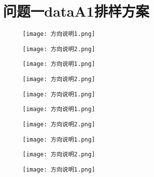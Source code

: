 \documentclass[bwprint]{gmcmthesis}
\begin{document}
\section{问题一dataA1排样方案}
\begin{figure}[!htbp]
    \centering
    \begin{minipage}{0.1\linewidth}
        \centering
        \texttt{[image: 方向说明1.png]}
    \end{minipage}
    \begin{minipage}{0.1\linewidth}
        \centering
        \texttt{[image: 方向说明2.png]}
    \end{minipage}
    \begin{minipage}{0.1\linewidth}
        \centering
        \texttt{[image: 方向说明1.png]}
    \end{minipage}
    \begin{minipage}{0.1\linewidth}
        \centering
        \texttt{[image: 方向说明2.png]}
    \end{minipage}
    \begin{minipage}{0.1\linewidth}
        \centering
        \texttt{[image: 方向说明1.png]}
    \end{minipage}
\end{figure}
\begin{figure}[!htbp]
    \centering
    \begin{minipage}{0.1\linewidth}
        \centering
        \texttt{[image: 方向说明1.png]}
    \end{minipage}
    \begin{minipage}{0.1\linewidth}
        \centering
        \texttt{[image: 方向说明2.png]}
    \end{minipage}
    \begin{minipage}{0.1\linewidth}
        \centering
        \texttt{[image: 方向说明1.png]}
    \end{minipage}
    \begin{minipage}{0.1\linewidth}
        \centering
        \texttt{[image: 方向说明2.png]}
    \end{minipage}
    \begin{minipage}{0.1\linewidth}
        \centering
        \texttt{[image: 方向说明1.png]}
    \end{minipage}
\end{figure}
\end{document}
